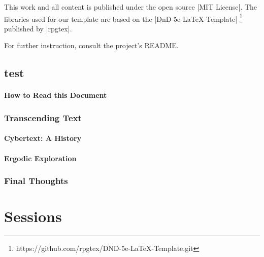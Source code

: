 \documentclass[10pt,twoside,twocolumn,openany,nomultitoc]{book}
\begin{document}
This work and all content is published under the open source |MIT License|. The libraries used for our template are based on the |DnD-5e-LaTeX-Template| \footnote{https://github.com/rpgtex/DND-5e-LaTeX-Template.git} published by |rpgtex|.  

For further instruction, consult the project's README.      
    


\chapter{test}
\subsection{How to Read this Document}
    \lipsum[2]
\section{Transcending Text}
    \lipsum[6]
\subsection{Cybertext: A History}
    \lipsum[3]
\subsection{Ergodic Exploration}
    \lipsum[4]
\section{Final Thoughts}
    \lipsum[5]



\part{Sessions}
\end{document}
